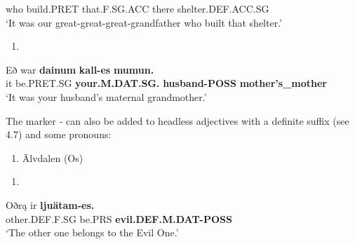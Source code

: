 who  build.PRET  that.F.SG.ACC  there  shelter.DEF.ACC.SG\\ %


‘It was our great-great-great-grandfather who built that shelter.’
\z


\begin{enumerate} %
\item 
\end{enumerate} %
\ea\label{}
\gll Eð  war  \textbf{dainum}\textbf{  kall-es}\textbf{  mumun.}\\


it  be.PRET.SG  \textbf{your.M.DAT.SG.} \textbf{husband-POSS} \textbf{mother’s\_mother}\\ %


‘It was your husband’s maternal grandmother.’
\z


The marker\textit{ {}-} can also be added to headless adjectives with a definite suffix (see 4.7) and some pronouns:

\begin{enumerate} %
\item 
Älvdalen (Os)  

\end{enumerate} %
\setcounter{listLFOxcviiileveli}{0}
\begin{enumerate} %
\item 
\end{enumerate} %
\ea\label{}
\gll Oðrą  ir  \textbf{ljuätam-es.}\\


other.DEF.F.SG  be.PRS  \textbf{evil.DEF.M.DAT-POSS}\\ %


‘The other one belongs to the Evil One.’
\z


